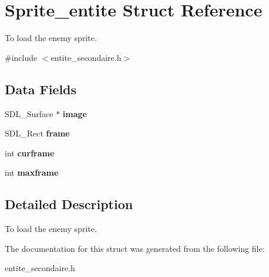 \hypertarget{structSprite__entite}{}\section{Sprite\+\_\+entite Struct Reference}
\label{structSprite__entite}


To load the enemy sprite.  




{\ttfamily \#include $<$entite\+\_\+secondaire.\+h$>$}

\subsection*{Data Fields}
\begin{DoxyCompactItemize}
\item 
\mbox{\label{structSprite__entite_aa8dec7395027cdfa3b8143c4f02b7764}} 
S\+D\+L\+\_\+\+Surface $\ast$ {\bfseries image}
\item 
\mbox{\label{structSprite__entite_a8aa8da5e0b1bc226ebbab21e7ff299de}} 
S\+D\+L\+\_\+\+Rect {\bfseries frame}
\item 
\mbox{\label{structSprite__entite_ae7b29752e80665e4e7bd39d1c98aede3}} 
int {\bfseries curframe}
\item 
\mbox{\label{structSprite__entite_a4971a024d3c9f9695de89f11bc64cb73}} 
int {\bfseries maxframe}
\end{DoxyCompactItemize}


\subsection{Detailed Description}
To load the enemy sprite. 

The documentation for this struct was generated from the following file\+:\begin{DoxyCompactItemize}
\item 
entite\+\_\+secondaire.\+h\end{DoxyCompactItemize}
